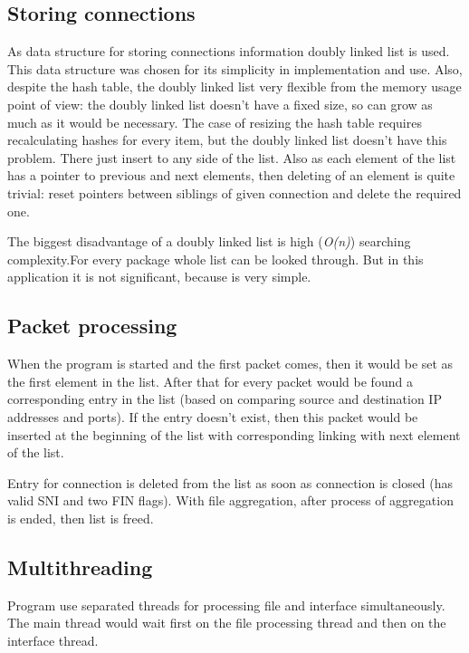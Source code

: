 \documentclass[12pt,a4paper]{article}
\begin{document}
    \subsection{Storing connections}
    As data structure for storing connections information doubly linked list is used.
    This data structure was chosen for its simplicity in implementation and use. 
    Also, despite the hash table, the doubly linked list very flexible from the 
    memory usage point of view: the doubly linked list doesn't have a fixed size, 
    so can grow as much as it would be necessary. The case of resizing the hash 
    table requires recalculating hashes for every item, but the doubly linked list 
    doesn't have this problem. There just insert to any side of the list. Also as 
    each element of the list has a pointer to previous and next elements, then 
    deleting of an element is quite trivial: reset pointers between siblings of 
    given connection and delete the required one.

    The biggest disadvantage of a doubly linked list is high (\textit{O(n)}) 
    searching complexity.For every package whole list can be looked through. 
    But in this application it is not significant, because is very simple. 

    \subsection{Packet processing}

    When the program is started and the first packet comes, then it would be set 
    as the first element in the list. After that for every packet would be found 
    a corresponding entry in the list (based on comparing source and destination 
    IP addresses and ports). If the entry doesn't exist, then this packet would 
    be inserted at the beginning of the list with corresponding linking with next
    element of the list.
    
    Entry for connection is deleted from the list as soon as connection is closed
    (has valid SNI and two FIN flags). With file aggregation, after process of
    aggregation is ended, then list is freed. 


    \subsection{Multithreading}
    Program use separated threads for processing file and interface simultaneously. 
    The main thread would wait first on the file processing thread and then on 
    the interface thread.
\end{document}
